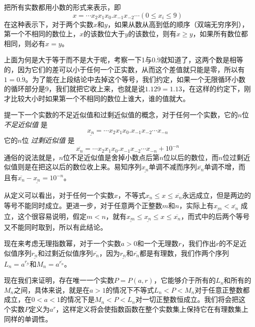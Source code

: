 把所有实数都用小数的形式来表示，即
\begin{equation}
  \label{eq:decimal-expression-of-real}
x=\cdots x_2x_1x_0.x_{-1}x_{-2}\cdots(0 \leqslant x_i \leqslant 9)
\end{equation}
在这种表示下，对于两个实数$x$和$y$，如果从数从高到低的顺序（双端无穷序列），第一个不相同的数位上，$x$的该数位大于$y$的该数位，则有$x \geqslant y$，如果所有数位都相同，则必有$x=y$。

上面为何是大于等于而不是大于呢，考察一下1与$0.\dot{9}$就知道了，这两个数是相等的，因为它们的差可以小于任何一个正实数，从而这个差值就只能是零，所以有$1=0.\dot{9}$。为了能在上段结论中去掉这个等号，我们约定，如果一个无限循环小数的循环部分是9，我们就把它收上来，也就是说$1.12\dot{9}=1.13$，在这样的约定下，刚才比较大小时如果第一个不相同的数位上谁大，谁的值就大。

提一下一个实数的不足近似值和过剩近似值的概念，对于任何一个实数，它的$n$位 \emph{不足近似值} 是
\begin{equation}
  \label{eq:lower-approximate-value-nth}
\underline{x_n}=\cdots x_2x_1x_0.x_{-1}x_{-2}\cdots x_{-n}
\end{equation}
它的$n$位 \emph{过剩近似值} 是
\begin{equation}
  \label{eq:upper-approximate-value-nth}
\overline{x_n}=\cdots x_2x_1x_0.x_{-1}x_{-2}\cdots x_{-n} + 10^{-n}
\end{equation}
通俗的说法就是，$n$位不足近似值是舍掉小数点后第$n$位以后的数位，而$n$位过剩近似值则是在把这以后的数位收上来。易知序列$\underline{x_n}$单调不减而序列$\overline{x_n}$单调不增，而且有$\overline{x_n}-\underline{x_n}=10^{-n}$。

从定义可以看出，对于任何一个实数$x$，不等式$\underline{x_n} \leqslant x \leqslant \overline{x_n}$永远成立，但是两边的等号不能同时成立。更进一步，对于任意两个正整数$m$和$n$，实际上有$\underline{x_m} < \overline{x_n}$ 成立，这个很容易说明，假定$m<n$，就有$\underline{x_m} \leqslant \underline{x_n} \leqslant x \leqslant \overline{x_n}$，而式中的后两个等号又不能同时取到，所以有此结论。

现在来考虑无理指数幂，对于一个实数$a>0$和一个无理数$r$，我们作出$r$的不足近似值序列$\underline{r_n}$和过剩近似值序列$\overline{r_n}$，因为$\underline{r_n}$和$\overline{r_n}$都是有理数，我们作两个序列$L_n=a^{\underline{r_n}}$和$M_n=a^{\overline{r_n}}$。

现在我们来证明，存在唯一一个实数$P=P(a,r)$，它能够介于所有的$L_n$和所有的$M_n$之间，具体来说，就是在$a>1$的情况下不等式$L_n<P<M_n$对于任意正整数都成立，在$0<a<1$的情况下是$M_n<P<L_n$对一切正整数恒成立。我们将会把这个实数$P$定义为$a^r$，这样定义将会使指数函数在整个实数集上保持它在有理数集上同样的单调性。


